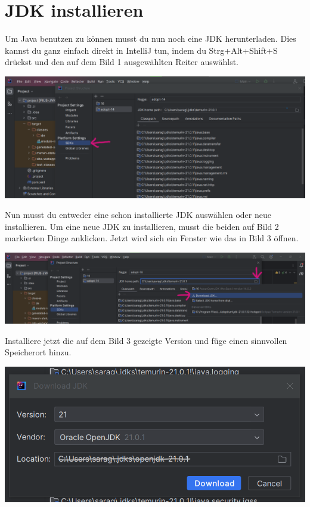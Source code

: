 \section*{JDK installieren}
Um Java benutzen zu können musst du nun noch eine JDK herunterladen. Dies kannst du ganz einfach direkt in IntelliJ tun, indem du Strg+Alt+Shift+S drückst und den auf dem Bild 1 ausgewählten Reiter auswählst.
\begin{center}
\includegraphics[width=\linewidth]{./figures/IntelliJ JDK.PNG}
\end{center}
Nun musst du entweder eine schon installierte JDK auswählen oder neue installieren. Um eine neue JDK zu installieren, musst die beiden auf Bild 2 markierten Dinge anklicken. Jetzt wird sich ein Fenster wie das in Bild 3 öffnen.
\begin{center}
\includegraphics[width=\linewidth]{./figures/IntelliJ JDK 2.PNG}
\end{center}
\newpage
Installiere jetzt die auf dem Bild 3 gezeigte Version und füge einen sinnvollen Speicherort hinzu.
\begin{center}
    \includegraphics[width=\linewidth]{./figures/IntelliJ JDK 3.PNG}
\end{center}